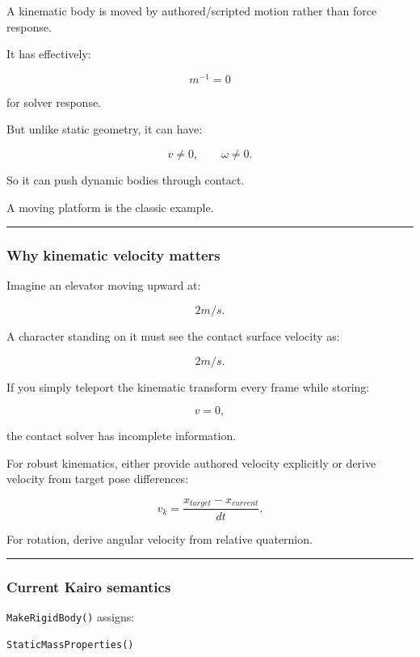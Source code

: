 A kinematic body is moved by authored/scripted motion rather than force response.

It has effectively:

\[
m^{-1}=0
\]

for solver response.

But unlike static geometry, it can have:

\[
v\neq0,
\qquad
\omega\neq0.
\]

So it can push dynamic bodies through contact.

A moving platform is the classic example.

\begin{center}\rule{0.5\linewidth}{0.5pt}\end{center}

\subsubsection{Why kinematic velocity matters}\label{why-kinematic-velocity-matters}

Imagine an elevator moving upward at:

\[
2m/s.
\]

A character standing on it must see the contact surface velocity as:

\[
2m/s.
\]

If you simply teleport the kinematic transform every frame while storing:

\[
v=0,
\]

the contact solver has incomplete information.

For robust kinematics, either provide authored velocity explicitly or derive velocity from target pose differences:

\[
v_k
=
\frac{x_{target}-x_{current}}{dt}.
\]

For rotation, derive angular velocity from relative quaternion.

\begin{center}\rule{0.5\linewidth}{0.5pt}\end{center}

\subsubsection{Current Kairo semantics}\label{current-kairo-semantics}

\texttt{MakeRigidBody()} assigns:

\begin{verbatim}
StaticMassProperties()
\end{verbatim}

